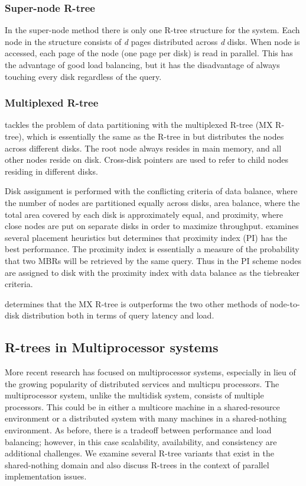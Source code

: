 \subsubsection{Super-node R-tree}
In the super-node method \cite{kamel1992parallel}\cite{thebook} there is only
one R-tree structure for the system. Each node in the structure consists of
\emph{d} pages distributed across \emph{d} disks. When node is accessed, each
page of the node (one page per disk) is read in parallel. This has the 
advantage of good load balancing, but it has the disadvantage of
always touching every disk regardless of the query.

\subsubsection{Multiplexed R-tree}
\cite{kamel1992parallel} tackles the problem of data partitioning with the 
multiplexed R-tree (MX R-tree), which is essentially the same as the R-tree 
in \cite{guttman84} but distributes the nodes across different disks. 
The root node always resides in main memory, and all other nodes reside on 
disk. Cross-disk pointers are used to refer to child nodes residing in 
different disks. 

Disk assignment is performed with the conflicting criteria of
data balance, where the number of nodes are partitioned equally across disks, 
area balance, where the total area covered by each disk is approximately 
equal, and proximity, where close nodes are put on separate disks in order to
maximize throughput. \cite{kamel1992parallel} examines several placement 
heuristics but determines that proximity index (PI) has the best performance. 
The proximity index is essentially a measure of the probability that two MBRs
will be retrieved by the same query. Thus in the PI scheme nodes are assigned 
to disk with the proximity index with data balance as the tiebreaker criteria.

\cite{kamel1992parallel} determines that the MX R-tree is outperforms the two
other methods of node-to-disk distribution both in terms of query latency and
load.
 
\subsection{R-trees in Multiprocessor systems}
More recent research has focused on multiprocessor systems, especially in 
lieu of the growing popularity of distributed services and multicpu processors.
The multiprocessor system, unlike the multidisk system, consists of multiple 
processors. This could be in either a multicore machine in a shared-resource
environment or a distributed system with many machines in a shared-nothing 
environment. As before, there is a tradeoff between performance and load 
balancing; however, in this case scalability, availability, and consistency
are additional challenges. We examine several R-tree variants that exist in
the shared-nothing domain and also discuss R-trees in the context of parallel 
implementation issues.

